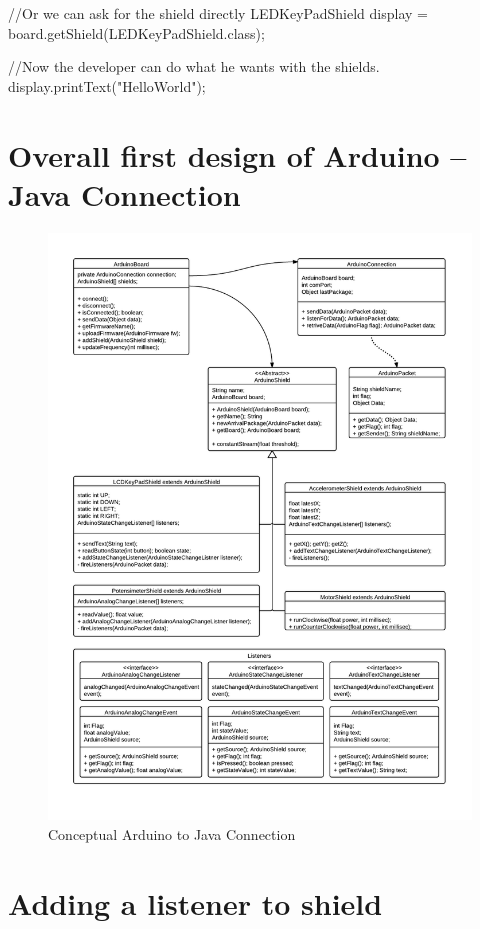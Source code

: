 //Or we can ask for the shield directly
LEDKeyPadShield display = board.getShield(LEDKeyPadShield.class);

//Now the developer can do what he wants with the shields.
display.printText("HelloWorld");

\section{Overall first design of Arduino – Java Connection}

\begin{figure}
	\centering
	\includegraphics{./img/architecture-arduinojava.png}
	\caption{Conceptual Arduino to Java Connection}
	\label{fig:architecture-arduinojava}
\end{figure}


\section{Adding a listener to shield}


